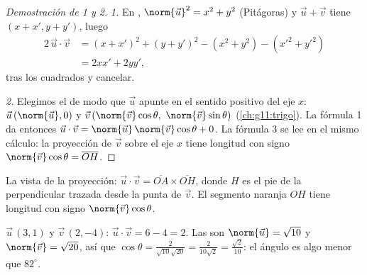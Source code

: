 \begin{proof}[Demostración de 1 y 2]
\emph{1.} En , $\norm{\vec u}^2 = x^2 + y^2$ (Pitágoras) y
$\vec u + \vec v$ tiene  $(x + x', y + y')$, luego
\begin{align*}
2\,\vec u \cdot \vec v
&= (x + x')^2 + (y + y')^2 - (x^2 + y^2) - (x'^2 + y'^2)\\
&= 2xx' + 2yy',
\end{align*}
tras  los cuadrados y cancelar.

\emph{2.} Elegimos el  de modo que $\vec u$ apunte
en el sentido positivo del eje $x$: $\vec u\,(\norm{\vec u}, 0)$ y
$\vec v\,(\norm{\vec v}\cos\theta,\ \norm{\vec v}\sin\theta)$
(\cref{ch:g11:trigo}). La fórmula 1 da entonces
$\vec u \cdot \vec v = \norm{\vec u}\,\norm{\vec v}\cos\theta + 0$. La
fórmula 3 se lee en el mismo cálculo: la proyección de $\vec v$ sobre el
eje $x$ tiene longitud con signo
$\norm{\vec v}\cos\theta = \overline{OH}$.
\end{proof}

\begin{omfigure}

{\small La vista de la proyección: $\vec u \cdot \vec v =
\overline{OA} \times \overline{OH}$, donde $H$ es el pie de la
perpendicular trazada desde la punta de $\vec v$. El segmento naranja $OH$
tiene longitud con signo $\norm{\vec v}\cos\theta$.}
\end{omfigure}

\begin{example}\label{ex:g11:scal:compute}
$\vec u\,(3, 1)$ y $\vec v\,(2, -4)$: $\vec u \cdot \vec v = 6 - 4 = 2$.
Las  son $\norm{\vec u} = \sqrt{10}$ y $\norm{\vec v} = \sqrt{20}$,
así que $\cos\theta = \frac{2}{\sqrt{10}\sqrt{20}} = \frac{2}{10\sqrt2}
= \frac{\sqrt2}{10}$: el ángulo es algo menor que $82^\circ$.
\end{example}

